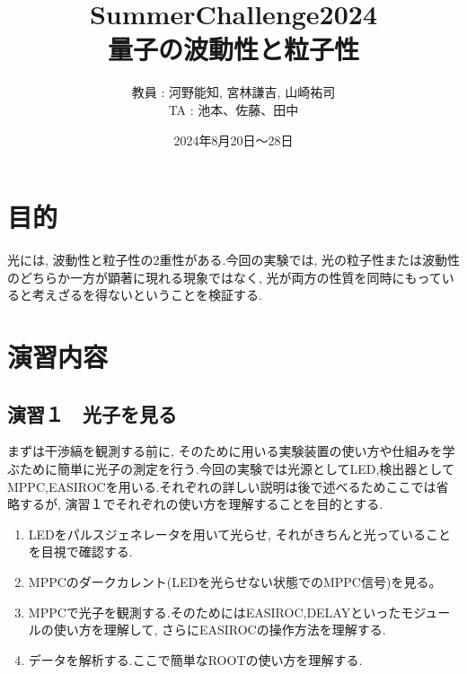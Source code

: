 \documentclass[uplatex,10pt,a4j]{jsarticle}
\begin{document}
\begin{titlepage}
  \title{SummerChallenge2024 \\ \Huge 量子の波動性と粒子性}
  \author{教員 : 河野能知, 宮林謙吉, 山崎祐司 \\TA : 池本、佐藤、田中}
  \date{2024年8月20日〜28日}
  \maketitle
\end{titlepage}

\tableofcontents
\clearpage

\section{目的}
光には, 波動性と粒子性の2重性がある.今回の実験では, 光の粒子性または波動性のどちらか一方が顕著に現れる現象ではなく, 光が両方の性質を同時にもっていると考えざるを得ないということを検証する.

\section{演習内容}

\subsection{演習１　光子を見る}
まずは干渉縞を観測する前に, そのために用いる実験装置の使い方や仕組みを学ぶために簡単に光子の測定を行う.今回の実験では光源としてLED,検出器としてMPPC,EASIROCを用いる.それぞれの詳しい説明は後で述べるためここでは省略するが, 演習１でそれぞれの使い方を理解することを目的とする.
\begin{enumerate}
  \item LEDをパルスジェネレータを用いて光らせ, それがきちんと光っていることを目視で確認する.
  \item MPPCのダークカレント(LEDを光らせない状態でのMPPC信号)を見る。
  \item MPPCで光子を観測する.そのためにはEASIROC,DELAYといったモジュールの使い方を理解して, さらにEASIROCの操作方法を理解する.
  \item データを解析する.ここで簡単なROOTの使い方を理解する.
\end{enumerate}
\end{document}
